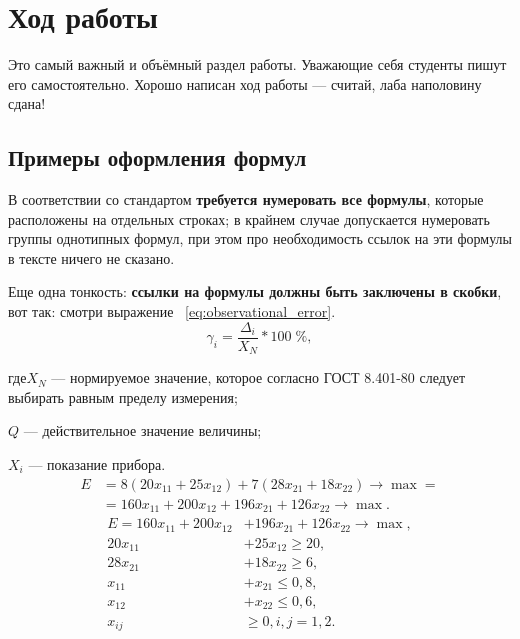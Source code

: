 \section{Ход работы}

Это самый важный и объёмный раздел работы. Уважающие себя студенты пишут его самостоятельно.
Хорошо написан ход работы --- считай, лаба наполовину сдана!


\subsection{Примеры оформления формул}

В соответствии со стандартом \textbf{требуется нумеровать все 
формулы}, которые расположены на отдельных строках; в крайнем случае допускается нумеровать
группы однотипных формул, при этом про необходимость ссылок на эти формулы в тексте ничего не сказано.

Еще одна тонкость: \textbf{ссылки на формулы должны быть заключены в скобки}, вот так: смотри выражение ~\eqref{eq:observational_error}.
\begin{equation}
  \label{eq:observational_error}
  \gamma_{i} = \dfrac{\Delta_{i}}{X_{N}}*100\;\%,
\end{equation}

\noindent где\hspace{1em}$ X_{N} $ --- нормируемое значение, которое согласно ГОСТ 8.401-80
следует выбирать равным пределу измерения;

$ Q $ --- действительное значение величины;

$ X_{i} $ --- показание прибора.
\begin{equation}
  \label{eq:BaseOpt}
  \begin{aligned}
    E &= 8(20x_{11} + 25x_{12}) + 7(28x_{21} + 18x_{22}) \rightarrow \max = \\
    &= 160x_{11} + 200x_{12} + 196x_{21} + 126x_{22} \rightarrow \max.
  \end{aligned}
\end{equation}
\begin{equation}
  \label{eq:BaseNSM}
    \begin{aligned}
      E = 160x_{11} + 200x_{12} &+ 196x_{21} + 126x_{22} \rightarrow \max, \\
      20x_{11} &+ 25x_{12} \ge 20, \\
      28x_{21} &+ 18x_{22} \ge 6, \\
      x_{11} &+ x_{21} \le 0{,}8, \\
      x_{12} &+ x_{22} \le 0{,}6, \\
      x_{ij} & \ge 0, i, j = 1, 2.
    \end{aligned}
\end{equation}

